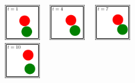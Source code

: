 \begin{figure}[h!]
    \centering
    
    \begin{subfigure}[t]{0.48\textwidth}
        \begin{subfigure}[t]{\textwidth}
            \includegraphics[width=0.22\textwidth]{figures/BBNF/BBNF3_cluster_2019_10_03_11_38_39/frame_00001.pdf}%
            ~
            \includegraphics[width=0.22\textwidth]{figures/BBNF/BBNF3_cluster_2019_10_03_11_38_39/frame_00004.pdf}%
            ~
            \includegraphics[width=0.22\textwidth]{figures/BBNF/BBNF3_cluster_2019_10_03_11_38_39/frame_00007.pdf}%
            ~
            \includegraphics[width=0.22\textwidth]{figures/BBNF/BBNF3_cluster_2019_10_03_11_38_39/frame_00010.pdf}%
        \end{subfigure}
        \vspace*{-0.5cm}
        \caption{}
        \label{fig:balls:trajectory}
    \end{subfigure}%
    

\end{figure}
